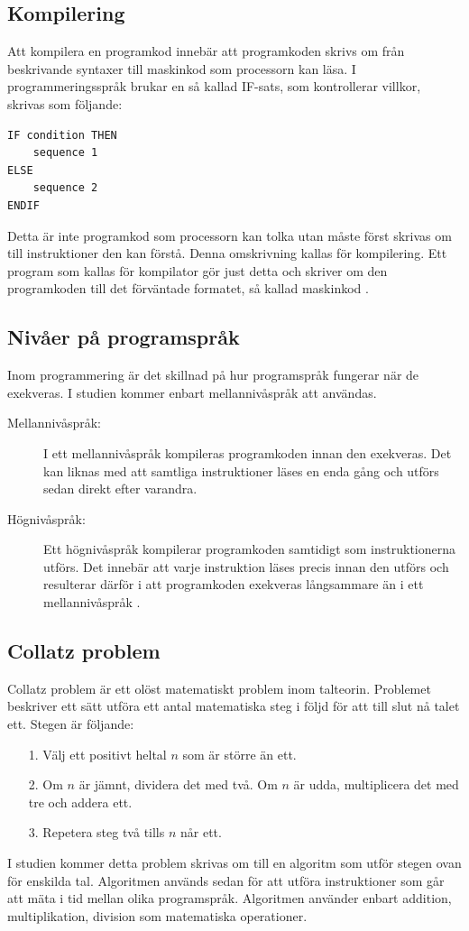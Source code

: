 \documentclass[12pt,swedish]{article}
\begin{document}
\subsection{Kompilering}
Att kompilera en programkod innebär att programkoden skrivs om från beskrivande syntaxer till maskinkod som processorn kan läsa. I programmeringsspråk brukar en så kallad IF-sats, som kontrollerar villkor, skrivas som följande:
\begin{lstlisting}
IF condition THEN
    sequence 1
ELSE
    sequence 2
ENDIF
\end{lstlisting}
Detta är inte programkod som processorn kan tolka utan måste först skrivas om till instruktioner den kan förstå. Denna omskrivning kallas för kompilering. Ett program som kallas för kompilator gör just detta och skriver om den programkoden till det förväntade formatet, så kallad maskinkod \citep{srikant_shankar_2008}.

\subsection{Nivåer på programspråk}
Inom programmering är det skillnad på hur programspråk fungerar när de exekveras. I studien kommer enbart mellannivåspråk att användas.
\begin{description}
    \item [Mellannivåspråk:] I ett mellannivåspråk kompileras programkoden innan den exekveras. Det kan liknas med att samtliga instruktioner läses en enda gång och utförs sedan direkt efter varandra.
    \item [Högnivåspråk:] Ett högnivåspråk kompilerar programkoden samtidigt som instruktionerna utförs. Det innebär att varje instruktion läses precis innan den utförs och resulterar därför i att programkoden exekveras långsammare än i ett mellannivåspråk \citep{maclachlan_1992}.
\end{description}

\subsection{Collatz problem}
Collatz problem är ett olöst matematiskt problem inom talteorin. Problemet beskriver ett sätt utföra ett antal matematiska steg i följd för att till slut nå talet ett. Stegen är följande:
\begin{enumerate}
    \item [1.] Välj ett positivt heltal \( n \) som är större än ett.
    \item [2.] Om \( n \) är jämnt, dividera det med två. Om \( n \) är udda, multiplicera det med tre och addera ett.
    \item [3.] Repetera steg två tills \( n \) når ett.
\end{enumerate}
I studien kommer detta problem skrivas om till en algoritm som utför stegen ovan för enskilda tal. Algoritmen används sedan för att utföra instruktioner som går att mäta i tid mellan olika programspråk. Algoritmen använder enbart addition, multiplikation, division som matematiska operationer.
\end{document}
